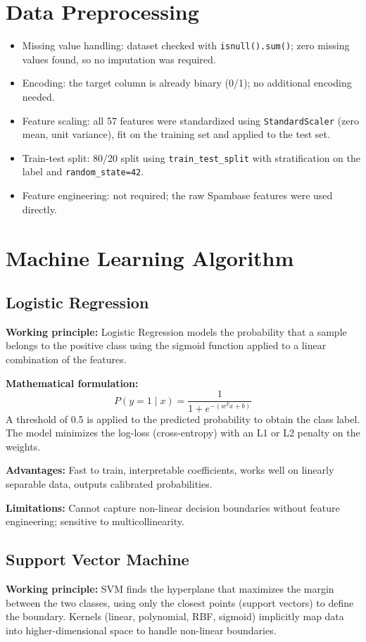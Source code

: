 \documentclass[12pt,a4paper]{article}
\begin{document}
\section{Data Preprocessing}
\begin{itemize}
\item Missing value handling: dataset checked with \texttt{isnull().sum()}; zero missing values
found, so no imputation was required.
\item Encoding: the target column is already binary (0/1); no additional encoding needed.
\item Feature scaling: all 57 features were standardized using \texttt{StandardScaler}
(zero mean, unit variance), fit on the training set and applied to the test set.
\item Train-test split: 80/20 split using \texttt{train\_test\_split} with stratification on the
label and \texttt{random\_state=42}.
\item Feature engineering: not required; the raw Spambase features were used directly.
\end{itemize}

\section{Machine Learning Algorithm}

\subsection*{Logistic Regression}
\textbf{Working principle:} Logistic Regression models the probability that a sample belongs to
the positive class using the sigmoid function applied to a linear combination of the features.

\textbf{Mathematical formulation:}
\[
P(y=1\mid x) = \frac{1}{1 + e^{-(w^Tx+b)}}
\]
A threshold of 0.5 is applied to the predicted probability to obtain the class label. The model
minimizes the log-loss (cross-entropy) with an L1 or L2 penalty on the weights.

\textbf{Advantages:} Fast to train, interpretable coefficients, works well on linearly
separable data, outputs calibrated probabilities.

\textbf{Limitations:} Cannot capture non-linear decision boundaries without feature
engineering; sensitive to multicollinearity.

\subsection*{Support Vector Machine}
\textbf{Working principle:} SVM finds the hyperplane that maximizes the margin between the two
classes, using only the closest points (support vectors) to define the boundary. Kernels
(linear, polynomial, RBF, sigmoid) implicitly map data into higher-dimensional space to handle
non-linear boundaries.
\end{document}
